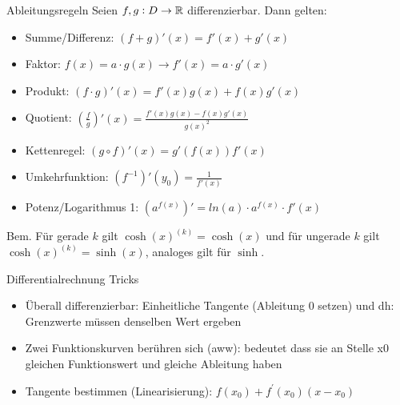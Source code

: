 \begin{concept}{Ableitungsregeln}
    Seien $f,g: D \to \mathbb{R}$  differenzierbar. Dann gelten:
    \begin{itemize}
        \item Summe/Differenz: $(f + g)'(x) = f'(x) + g'(x)$
        \item Faktor: $f(x)=a\cdot g(x) \rightarrow f'(x)=a \cdot g'(x) $
        \item Produkt: $(f \cdot g)'(x) = f'(x)g(x) + f(x)g'(x)$
        \item Quotient: $\left(\frac{f}{g}\right)'(x) = \frac{f'(x) g(x) - f(x) g'(x)}{g(x)^2}$
        \item Kettenregel: $(g \circ f)' (x) = g'(f(x)) f'(x)$
        \item Umkehrfunktion: $\left(f^{-1}\right)'(y_0) = \frac{1}{f'(x)}$
        \item Potenz/Logarithmus 1: 
        $(a^{f(x)})' = ln(a) \cdot a^{f(x)} \cdot f'(x)$

    \end{itemize}
    Bem. Für gerade $k$ gilt $\cosh (x)^{(k)}=\cosh (x)$ und für ungerade $k$ gilt $\cosh (x)^{(k)}=\sinh (x)$, analoges gilt für $\sinh$.
\end{concept}

 \begin{KR}{Differentialrechnung Tricks}
        \begin{itemize}
      \item Überall differenzierbar: Einheitliche Tangente (Ableitung 0 setzen) und dh: Grenzwerte müssen denselben Wert ergeben
      \item Zwei Funktionskurven berühren sich (aww): bedeutet dass sie an Stelle x0 gleichen Funktionswert und gleiche Ableitung haben
      \item Tangente bestimmen (Linearisierung): $f\left(x_{0}\right)+f^{\prime}\left(x_{0}\right)\left(x-x_{0}\right)$
    \end{itemize}
    \end{KR}

